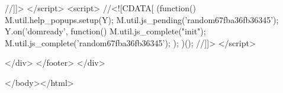 //]]>
</script>
<script>
//<![CDATA[
(function() {M.util.help_popups.setup(Y);
 M.util.js_pending('random67fba36fb36345'); Y.on('domready', function() { M.util.js_complete("init");  M.util.js_complete('random67fba36fb36345'); });
})();
//]]>
</script>

        </div>
    </footer>
</div>


</body></html>